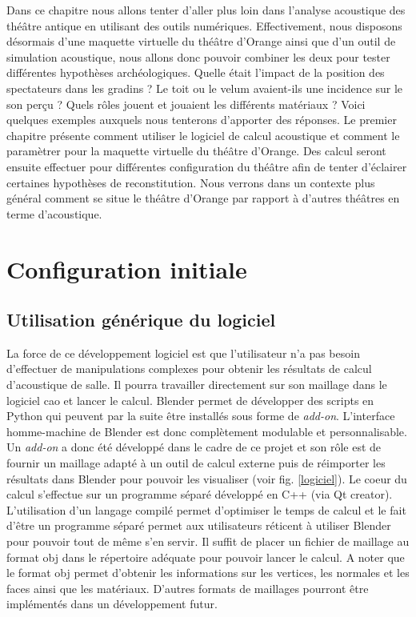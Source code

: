 Dans ce chapitre nous allons tenter d'aller plus loin dans l'analyse acoustique des théâtre antique en utilisant des outils numériques. Effectivement, nous disposons désormais d'une maquette virtuelle du théâtre d'Orange ainsi que d'un outil de simulation acoustique, nous allons donc pouvoir combiner les deux pour tester différentes hypothèses archéologiques. Quelle était l'impact de la position des spectateurs dans les gradins ? Le toit ou le \gls{velum} avaient-ils une incidence sur le son perçu ? Quels rôles jouent et jouaient les différents matériaux ? Voici quelques exemples auxquels nous tenterons d'apporter des réponses. Le premier chapitre présente comment utiliser le logiciel de calcul acoustique et comment le paramètrer pour la maquette virtuelle du théâtre d'Orange. Des calcul seront ensuite effectuer pour différentes configuration du théâtre afin de tenter d'éclairer certaines hypothèses de reconstitution. Nous verrons dans un contexte plus général comment se situe le théâtre d'Orange par rapport à d'autres théâtres en terme d'acoustique.	
	
\chapter{Configuration initiale}
	\minitoc
	\newpage
	
	\section{Utilisation générique du logiciel}
	
La force de ce développement logiciel est que l'utilisateur n'a pas besoin d'effectuer de manipulations complexes pour obtenir les résultats de calcul d'acoustique de salle. Il pourra travailler directement sur son maillage dans le logiciel \gls{cao} et lancer le calcul. Blender permet de développer des scripts en Python qui peuvent par la suite être installés sous forme de \textit{add-on}. L'interface homme-machine de Blender est donc complètement modulable et personnalisable. Un \textit{add-on} a donc été développé dans le cadre de ce projet et son rôle est de fournir un maillage adapté à un outil de calcul externe puis de réimporter les résultats dans Blender pour pouvoir les visualiser (voir fig. \ref{logiciel}). Le coeur du calcul s'effectue sur un programme séparé développé en C++ (via Qt creator). L'utilisation d'un langage compilé permet d'optimiser le temps de calcul et le fait d'être un programme séparé permet aux utilisateurs réticent à utiliser Blender pour pouvoir tout de même s'en servir. Il suffit de placer un fichier de maillage au format \gls{obj} dans le répertoire adéquate pour pouvoir lancer le calcul. A noter que le format \gls{obj} permet d'obtenir les informations sur les vertices, les normales et les faces ainsi que les matériaux. D'autres formats de maillages pourront être implémentés dans un développement futur.

